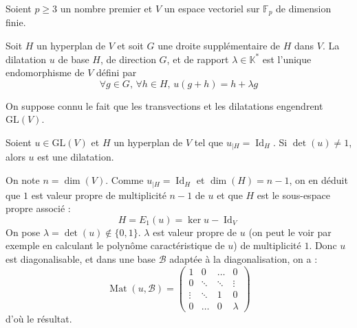 




	Soient $p \geq 3$ un nombre premier et $V$ un espace vectoriel sur $\mathbb{F}_p$ de dimension finie.


	\begin{definition}
		Soit $H$ un hyperplan de $V$ et soit $G$ une droite supplémentaire de $H$ dans $V$.
		La dilatation $u$ de base $H$, de direction $G$, et de rapport $\lambda \in \mathbb{K}^*$ est l'unique endomorphisme de $V$ défini par
		\[ \forall g \in G, \, \forall h \in H, \, u(g+h) = h + \lambda g \]
	\end{definition}


	\begin{remark}
		\label{theoreme-de-frobenius-zolotarev-1}
		On suppose connu le fait que les transvections et les dilatations engendrent $\mathrm{GL}(V)$.
	\end{remark}


	\begin{lemma}
		\label{theoreme-de-frobenius-zolotarev-2}
		Soient $u \in \mathrm{GL}(V)$ et $H$ un hyperplan de $V$ tel que $u_{|H} = \operatorname{Id}_H$. Si $\det(u) \neq 1$, alors $u$ est une dilatation.
	\end{lemma}

	\begin{demonstration}
		On note $n = \dim(V)$. Comme $u_{|H} = \operatorname{Id}_H$ et $\dim(H) = n-1$, on en déduit que $1$ est valeur propre de multiplicité $n-1$ de $u$ et que $H$ est le sous-espace propre associé :
		\[ H = E_1(u) = \ker{u - \operatorname{Id}_V} \]
		On pose $\lambda = \det(u) \notin \{ 0, 1 \}$. $\lambda$ est valeur propre de $u$ (on peut le voir par exemple en calculant le polynôme caractéristique de $u$) de multiplicité $1$. Donc $u$ est diagonalisable, et dans une base $\mathcal{B}$ adaptée à la diagonalisation, on a :
		\[ \operatorname{Mat}(u, \mathcal{B}) =
		\begin{pmatrix}
			1 & 0 & \dots & 0 \\
			0 & \ddots & \ddots & \vdots \\
			\vdots & \ddots & 1 & 0 \\
			0 & \dots & 0 & \lambda
		\end{pmatrix}
		\]
		d'où le résultat.
	\end{demonstration}

